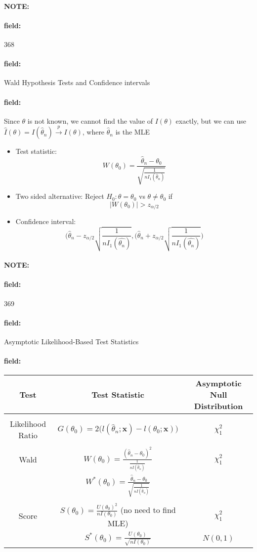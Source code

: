 \documentclass[12pt]{article}
\newenvironment{note}{\paragraph{NOTE:}}{}
\newenvironment{field}{\paragraph{field:}}{}
\begin{document}
\begin{note}
    \begin{field}
        \tiny 368
    \end{field}
    \begin{field}
        Wald Hypothesis Tests and Confidence intervals
    \end{field}
    \begin{field}
        Since $\theta$ is not known, we cannot find the value of $I(\theta)$ exactly, but we can use $\hat{I}(\theta) = I(\hat{\theta}_n) \overset{p}{\to} I(\theta)$, where $\hat{\theta}_n$ is the MLE
        \begin{itemize}
          \item Test statistic: $$W(\theta_0) = \frac{\hat{\theta}_n - \theta_0}{\sqrt{\frac{1}{nI_1(\hat{\theta}_n)}}} $$
          \item Two sided alternative: Reject $H_0: \theta = \theta_0$ vs $\theta \neq \theta_0$ if
          $$|W(\theta_0)| > z_{\alpha/2} $$
          \item Confidence interval:
          $$\bigg( \hat{\theta}_n - z_{\alpha/2} \sqrt{\frac{1}{nI_1(\hat{\theta_n})}},\bigg( \hat{\theta}_n + z_{\alpha/2} \sqrt{\frac{1}{nI_1(\hat{\theta_n})}} \bigg) $$
        \end{itemize}
    \end{field}
\end{note}

\begin{note}
    \begin{field}
        \tiny 369
    \end{field}
    \begin{field}
        Asymptotic Likelihood-Based Test Statistics
    \end{field}
    \begin{field}
        \begin{tabular}{c c c }
          Test & Test Statistic & Asymptotic Null Distribution \\
          \hline \\
          Likelihood Ratio & $G(\theta_0) = 2\big(l(\hat{\theta}_n; \mathbf{x}) - l(\theta_0; \mathbf{x})\big)$ & $\chi^2_1$\\
          \hline \\
          Wald & $W(\theta_0) = \frac{(\hat{\theta}_n - \theta_0)^2}{\frac{1}{n I(\hat{\theta}_n)}}$ & $\chi^2_1$\\
          & $W^*(\theta_0) = \frac{\hat{\theta}_n - \theta_0}{\sqrt{\frac{1}{n I(\hat{\theta}_n)}}}$ \\
          \hline \\
          Score & $S(\theta_0) = \frac{U(\theta_0)^2}{nI(\theta_0)}$ (no need to find MLE) & $\chi^2_1$ \\
          & $S^*(\theta_0) = \frac{U(\theta_0)}{\sqrt{nI(\theta_0)}}$ & $N(0,1)$
        \end{tabular}
    \end{field}
\end{note}
\end{document}
